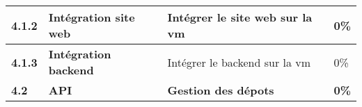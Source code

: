 \begin{supertabular}{|p{1.5cm} p{6cm}|p{5cm}|R{2cm}|}
  \hspace{6pt}
  \textbf{4.1.2}  & \textbf{Intégration site web} & Intégrer le site web sur la vm & 0\% \\
  \hline

  \hspace{6pt}
  \textbf{4.1.3}  & \textbf{Intégration backend} & Intégrer le backend sur la vm & 0\% \\
  \hline


  \textbf{4.2}  & \textbf{API} & \textbf{Gestion des dépots} & \textbf{0\%} \\
  \hline



\end{supertabular}
\normalsize

